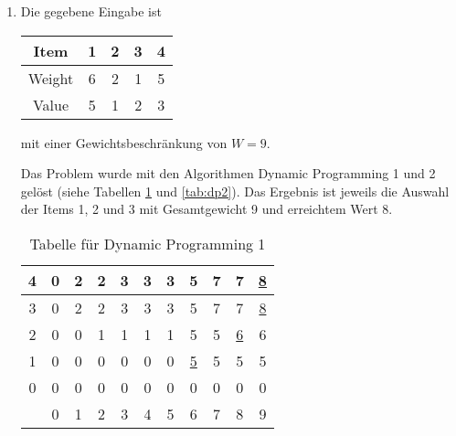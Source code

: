 \documentclass[a4paper]{scrartcl}
\newcommand{\approxalg}[1]{$#1$-Ap\-pro\-xi\-ma\-ti\-ons\-al\-go\-rith\-mus}
\newcommand{\gdw}{\ \Leftrightarrow\ }
\begin{document}
\begin{enumerate}[label=\bfseries \arabic*.]
    Da $x^\ast$ eine Lösung für das LP-Problem ist, gilt $\sum_{a_i \in B_j}
    x^\ast_i \geq 1$ für jedes $B_j$.  Da $|B_j| \leq b$, muss es mindestens
    einen Summanden $x^\ast_i \geq \frac{1}{b}$ in dieser Summe geben.
    Es ist also $S \cap B_j \neq \emptyset$, $j \in \{1, \dotsc, m\}$ und $S$
    ein Hitting Set.

    Sei $S^\ast$ ein Hitting Set mit minimalem Gewicht. Dann gilt
    \begin{equation*}
        \begin{gathered}
            \sum_{a_i \in S^\ast} w_i
            \geq \sum_{a_i \in A} x^\ast_i \cdot w_i
            \geq \sum_{a_i \in S} x^\ast_i \cdot w_i
            \geq \sum_{a_i \in S} \frac{1}{b} \cdot w_i
            \geq \frac{1}{b} \cdot \sum_{a_i \in S} w_i \\
            \gdw \\
            \frac{\sum_{a_i \in S} w_i}{\sum_{a_i \in S^\ast} w_i}
            \leq b.
        \end{gathered}
    \end{equation*}
    Die beschriebene Methode ist also ein \approxalg{b} für das Hitting Set
    Problem.

\item %
    Die gegebene Eingabe ist
    \begin{table}[H]
        \centering
        \begin{tabular}{c||c|c|c|c}
            Item   & 1 & 2 & 3 & 4 \\ \hline \hline
            Weight & 6 & 2 & 1 & 5 \\ \hline
            Value  & 5 & 1 & 2 & 3 \\
        \end{tabular}
    \end{table}
    mit einer Gewichtsbeschränkung von $W = 9$.

    Das Problem wurde mit den Algorithmen Dynamic Programming 1 und 2 gelöst
    (siehe Tabellen \ref{tab:dp1} und \ref{tab:dp2}).
    Das Ergebnis ist jeweils die Auswahl der Items 1, 2 und 3 mit Gesamtgewicht
    9 und erreichtem Wert 8.

    \begin{table}[H]
        \centering
        \begin{tabular}[t]{c||c|c|c|c|c|c|c|c|c|c}
            4 & 0 & 2 & 2 & 3 & 3 & 3 & 5 & 7 & 7 & \underline{8} \\ \hline
            3 & 0 & 2 & 2 & 3 & 3 & 3 & 5 & 7 & 7 & \underline{8} \\ \hline
            2 & 0 & 0 & 1 & 1 & 1 & 1 & 5 & 5 & \underline{6} & 6 \\ \hline
            1 & 0 & 0 & 0 & 0 & 0 & 0 & \underline{5} & 5 & 5 & 5 \\ \hline
            0 & 0 & 0 & 0 & 0 & 0 & 0 & 0 & 0 & 0 & 0 \\ \hhline{=#=|=|=|=|=|=|=|=|=|=|}
              & 0 & 1 & 2 & 3 & 4 & 5 & 6 & 7 & 8 & 9\\
        \end{tabular}
        \caption{Tabelle für Dynamic Programming 1}
        \label{tab:dp1}
    \end{table}


\end{enumerate}
\end{document}
